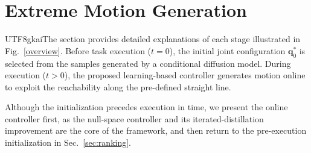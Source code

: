\documentclass[journal, twoside]{IEEEtran}
\newcommand{\xinyi}[1]{{\color{darkorange}\begin{CJK*}{UTF8}{gkai}#1\end{CJK*}}}
\newcommand{\rst}[1]{{\color{rstcolor}#1}}
\begin{document}
\section{Extreme Motion Generation}
\xinyi{The section provides detailed explanations of each stage illustrated in Fig.~\ref{overview}. Before task execution ($t=0$), the initial joint configuration $\mathbf{q}_{0}^{*}$ is selected from the samples generated by a conditional diffusion model. During execution ($t>0$), the proposed learning-based controller generates motion online to exploit the reachability along the pre-defined straight line.
}
\rst{Although the initialization precedes execution in time, we present the online controller first, as the null-space controller and its iterated-distillation improvement are the core of the framework, and then return to the pre-execution initialization in Sec.~\ref{sec:ranking}.}

\end{document}
